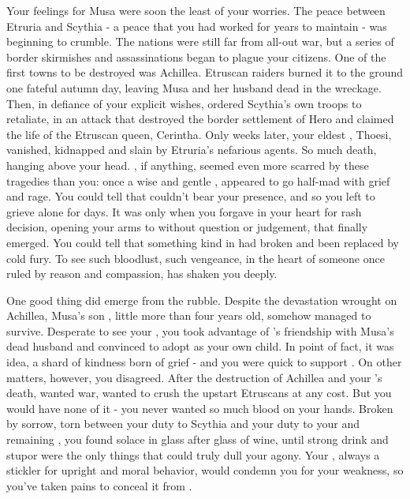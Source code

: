\documentclass[char]{Kos}
\begin{document}
Your feelings for Musa were soon the least of your worries. The peace between Etruria and Scythia - a peace that you had worked for years to maintain - was beginning to crumble. The nations were still far from all-out war, but a series of border skirmishes and assassinations began to plague your citizens. One of the first towns to be destroyed was Achillea. Etruscan raiders burned it to the ground one fateful autumn day, leaving Musa and her husband dead in the wreckage. Then, in defiance of your explicit wishes, \cScythiaQueen{\Monarch} \cScythiaQueen{} ordered Scythia's own troops to retaliate, in an attack that destroyed the border settlement of Hero and claimed the life of the Etruscan queen, Cerintha. Only weeks later, your eldest \cFugitive{\offspring}, Thoesi, vanished, kidnapped and slain by Etruria's nefarious agents. So much death, hanging above your head. \cScythiaQueen{}, if anything, seemed even more scarred by these tragedies than you: once a wise and gentle \cScythiaQueen{\human}, \cScythiaQueen{\they} appeared to go half-mad with grief and rage. You could tell that \cScythiaQueen{\they} couldn't bear your presence, and so you left \cScythiaQueen{\them} to grieve alone for days. It was only when you forgave \cScythiaQueen{\them} in your heart for \cScythiaQueen{\their} rash decision, opening your arms to \cScythiaQueen{\them} without question or judgement, that \cScythiaQueen{\they} finally emerged. You could tell that something kind in \cScythiaQueen{\them} had broken and been replaced by cold fury. To see such bloodlust, such vengeance, in the heart of someone once ruled by reason and compassion, has shaken you deeply.

One good thing did emerge from the rubble. Despite the devastation wrought on Achillea, Musa's son \cWard{}, little more than four years old, somehow managed to survive. Desperate to see your \cWard{\offspring}, you took advantage of \cScythiaQueen{}'s friendship with Musa's dead husband and convinced \cScythiaQueen{\them} to adopt \cWard{} as your own child. In point of fact, it was \cScythiaQueen{\their} idea, a shard of kindness born of grief - and you were quick to support \cScythiaQueen{\them}. On other matters, however, you disagreed. After the destruction of Achillea and your \cFugitive{\offspring}'s death, \cScythiaQueen{} wanted war, wanted to crush the upstart Etruscans at any cost. But you would have none of it - you never wanted so much blood on your hands. Broken by sorrow, torn between your duty to Scythia and your duty to your \cScythiaQueen{\spouse} and remaining \cBride{\offspring}, you found solace in glass after glass of wine, until strong drink and stupor were the only things that could truly dull your agony. Your \cScythiaQueen{\spouse}, always a stickler for upright and moral behavior, would condemn you for your weakness, so you've taken pains to conceal it from \cScythiaQueen{\them}.
\end{document}
